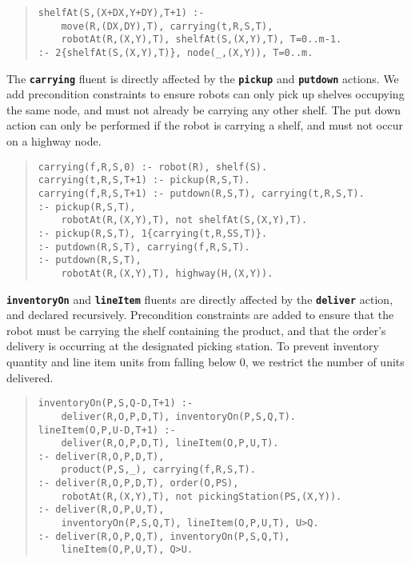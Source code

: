 \documentclass[letterpaper]{article}
\newcommand{\ct}[1]{\texttt{\textbf{#1}}}
\begin{document}
\begin{quote}\begin{scriptsize}\begin{verbatim}
shelfAt(S,(X+DX,Y+DY),T+1) :-
    move(R,(DX,DY),T), carrying(t,R,S,T),
    robotAt(R,(X,Y),T), shelfAt(S,(X,Y),T), T=0..m-1.
:- 2{shelfAt(S,(X,Y),T)}, node(_,(X,Y)), T=0..m.
\end{verbatim}\end{scriptsize}\end{quote}

The \ct{carrying} fluent is directly affected by the \ct{pickup} and \ct{putdown} actions. We add precondition constraints to ensure robots can only pick up shelves occupying the same node, and must not already be carrying any other shelf. The put down action can only be performed if the robot is carrying a shelf, and must not occur on a highway node.

\begin{quote}\begin{scriptsize}\begin{verbatim}
carrying(f,R,S,0) :- robot(R), shelf(S).
carrying(t,R,S,T+1) :- pickup(R,S,T).
carrying(f,R,S,T+1) :- putdown(R,S,T), carrying(t,R,S,T).
:- pickup(R,S,T),
    robotAt(R,(X,Y),T), not shelfAt(S,(X,Y),T).
:- pickup(R,S,T), 1{carrying(t,R,SS,T)}.
:- putdown(R,S,T), carrying(f,R,S,T).
:- putdown(R,S,T),
    robotAt(R,(X,Y),T), highway(H,(X,Y)).
\end{verbatim}\end{scriptsize}\end{quote}

\ct{inventoryOn} and \ct{lineItem} fluents are directly affected by the \ct{deliver} action, and declared recursively. Precondition constraints are added to ensure that the robot must be carrying the shelf containing the product, and that the order's delivery is occurring at the designated picking station. To prevent inventory quantity and line item units from falling below 0, we restrict the number of units delivered.

\begin{quote}\begin{scriptsize}\begin{verbatim}
inventoryOn(P,S,Q-D,T+1) :-
    deliver(R,O,P,D,T), inventoryOn(P,S,Q,T).
lineItem(O,P,U-D,T+1) :-
    deliver(R,O,P,D,T), lineItem(O,P,U,T).
:- deliver(R,O,P,D,T),
    product(P,S,_), carrying(f,R,S,T).
:- deliver(R,O,P,D,T), order(O,PS),
    robotAt(R,(X,Y),T), not pickingStation(PS,(X,Y)).
:- deliver(R,O,P,U,T),
    inventoryOn(P,S,Q,T), lineItem(O,P,U,T), U>Q.
:- deliver(R,O,P,Q,T), inventoryOn(P,S,Q,T),
    lineItem(O,P,U,T), Q>U.
\end{verbatim}\end{scriptsize}\end{quote}
\end{document}
